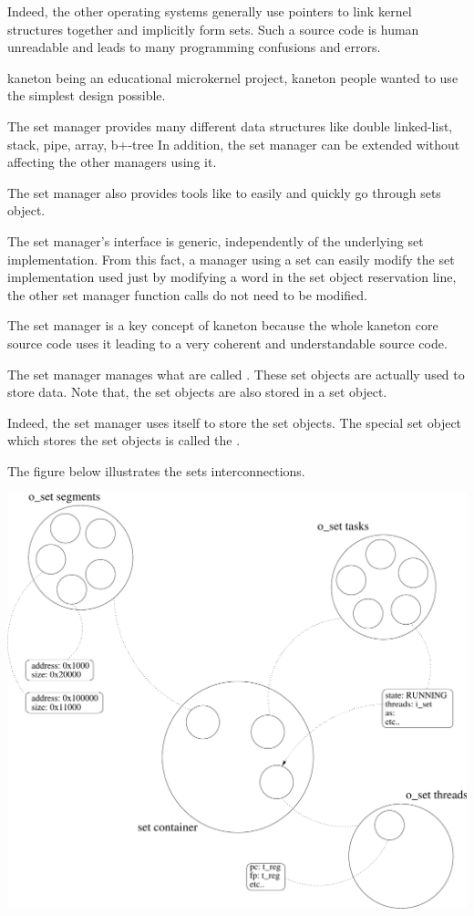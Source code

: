 \begin{multicols}{2}
Indeed, the other operating systems generally use pointers to link kernel
structures together and implicitly form sets. Such a source code is human
unreadable and leads to many programming confusions and errors.

kaneton being an educational microkernel project, kaneton people wanted
to use the simplest design possible.

The set manager provides many different data structures like double
linked-list, stack, pipe, array, b+-tree \etc{} In addition, the set
manager can be extended without affecting the other managers using it.

The set manager also provides tools like  to easily and
quickly go through sets object.

The set manager's interface is generic, independently of the underlying set
implementation. From this fact, a manager using a set can easily modify
the set implementation used just by modifying a word in the set
object reservation line, the other set manager function calls do not
need to be modified.

The set manager is a key concept of kaneton because the whole kaneton
core source code uses it leading to a very coherent and understandable
source code.

The set manager manages what are called . These set
objects are actually used to store data. Note that, the set objects are
also stored in a set object.

Indeed, the set manager uses itself to store the set objects. The special
set object which stores the set objects is called the .

The figure below illustrates the sets interconnections.

\end{multicols}

\begin{center}
  \includegraphics[scale=0.5]{figures/sets.pdf}
\end{center}

